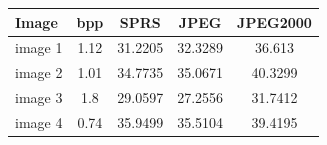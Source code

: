 \begin{table}[H]
\centering
\begin{tabular}{| l c | c | c | c|}
\hline\hline
Image & bpp & SPRS & JPEG & JPEG2000 \\
\hline
image 1 & 1.12 & 31.2205 & 32.3289 & 36.613 \\
image 2 & 1.01 & 34.7735 & 35.0671 & 40.3299 \\
image 3 & 1.8  & 29.0597 & 27.2556 & 31.7412 \\
image 4 & 0.74  & 35.9499 & 35.5104 & 39.4195 \\

\hline
\end{tabular}
\end{table}

\begin{figure}[H]
\centering
{}
\hspace{5mm}
\hspace{5mm}
\end{figure}

